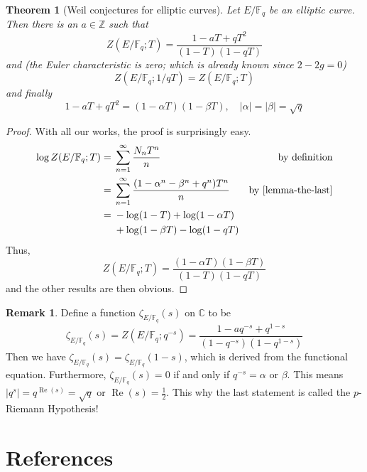 \documentclass[12pt]{article}
\newtheorem{theorem}{Theorem}[subsection]
\theoremstyle{remark}
\theoremstyle{definition}
\newtheorem{remark}{Remark}[subsection]
\newcommand{\Z}[0]{\mathbb{Z}}
\newcommand{\F}[0]{\mathbb{F}}
\newcommand{\C}[0]{\mathbb{C}}
\renewcommand{\Re}[0]{\operatorname{Re}}
\begin{document}
        \begin{theorem}[Weil conjectures for elliptic curves]\label{theorem-the-last}
            Let $E/\F_q$ be an elliptic curve. Then there is an $a\in\Z$ such that
            \[Z(E/\F_q;T)=\frac{1-aT+qT^2}{(1-T)(1-qT)}\]
            and (the Euler characteristic is zero; which is already known since $2-2g=0$)
            \[Z(E/\F_q;1/qT)=Z(E/\F_q;T)\]
            and finally
            \[1-aT+qT^2=(1-\alpha T)(1-\beta T),\quad|\alpha|=|\beta|=\sqrt{q}\]
        \end{theorem}
        \begin{proof}
            With all our works, the proof is surprisingly easy.
            \begin{align*}
                \log Z(E/\F_q;T)={}&\sum_{n=1}^\infty\frac{N_nT^n}{n} &\text{by definition}\\
                ={}&\sum_{n=1}^\infty\frac{(1-\alpha^n-\beta^n+q^n)T^n}{n}&\text{by \autoref{lemma-the-last}}\\
                ={}&-\log(1-T)+\log(1-\alpha T)\\
                &+\log(1-\beta T)-\log(1- qT)
            \end{align*}
            Thus,
            \[Z(E/\F_q;T)=\frac{(1-\alpha T)(1-\beta T)}{(1-T)(1-qT)}\]
            and the other results are then obvious.
        \end{proof}
        \begin{remark}\label{remark-p-rh}
            Define a function $\zeta_{E/\F_q}(s)$ on $\C$ to be
            \[\zeta_{E/\F_q}(s)=Z(E/\F_q;q^{-s})=\frac{1-aq^{-s}+q^{1-s}}{(1-q^{-s})(1-q^{1-s})}\]
            Then we have $\zeta_{E/\F_q}(s)=\zeta_{E/\F_q}(1-s)$, which is derived from the functional equation. Furthermore, $\zeta_{E/\F_q}(s)=0$ if and only if $q^{-s}=\alpha$ or $\beta$. This means $|q^{s}|=q^{\Re(s)}=\sqrt{q}$ or $\Re(s)=\frac{1}{2}$. This why the last statement is called the $p$-Riemann Hypothesis!
        \end{remark}
        \newpage
        \section{References}
        \nocite{*}
        \renewcommand{\section}[2]{\vskip 0.01em}
        \printbibliography
\end{document}
